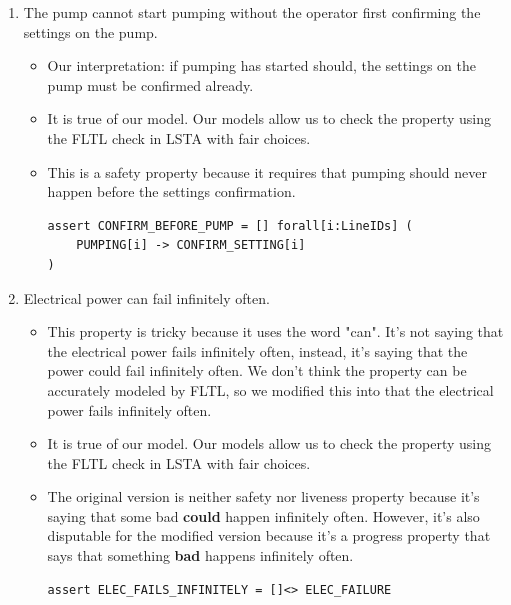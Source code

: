 \documentclass[titlepage]{article}
\begin{document}
\begin{enumerate}
\item The pump cannot start pumping without the operator first confirming the settings on the pump.
    \begin{itemize}
        \item Our interpretation: if pumping has started should, the settings on the pump must be confirmed already.
        \item It is true of our model. Our models allow us to check the property using the FLTL check in LSTA with fair choices.
        \item This is a safety property because it requires that pumping should never happen before the settings confirmation.
        \begin{verbatim}
assert CONFIRM_BEFORE_PUMP = [] forall[i:LineIDs] (
    PUMPING[i] -> CONFIRM_SETTING[i]
)
        \end{verbatim}
    \end{itemize}
\item Electrical power can fail infinitely often.
    \begin{itemize}
        \item This property is tricky because it uses the word "can". It's not saying that the electrical power fails infinitely often, instead, it's saying that the power could fail infinitely often. We don't think the property can be accurately modeled by FLTL, so we modified this into that the electrical power fails infinitely often.
        \item It is true of our model. Our models allow us to check the property using the FLTL check in LSTA with fair choices.
        \item The original version is neither safety nor liveness property because it's saying that some bad \textbf{could} happen infinitely often. However, it's also disputable for the modified version because it's a progress property that says that something \textbf{bad} happens infinitely often.
\begin{verbatim}
assert ELEC_FAILS_INFINITELY = []<> ELEC_FAILURE
\end{verbatim}
    \end{itemize}


\end{enumerate}
\end{document}
